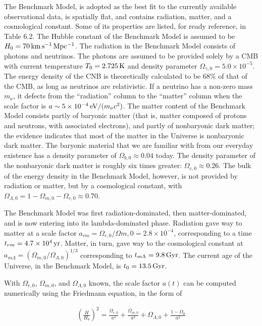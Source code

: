 \documentclass[a4paper,11pt]{article}
\begin{document}
The Benchmark Model, is adopted as the best fit to the currently available observational data, is spatially flat, and contains radiation, matter, and a cosmological constant. Some of its properties are listed, for ready reference, in Table 6.2. The Hubble constant of the Benchmark Model is assumed to be $H_0=70\,{\rm km\,s^{-1}\,Mpc^{-1}}$. The radiation in the Benchmark Model consists of photons and neutrinos. The photons are assumed to be provided solely by a CMB with current temperature $T_0=2.725\,{\rm K}$ and density parameter $\Omega_{\gamma,0}=5.0\times10^{-5}$. The energy density of the CNB is theoretically calculated to be 68\% of that of the CMB, as long as neutrinos are relativistic. If a neutrino has a non-zero mass $m_\nu$, it defects from the ``radiation'' column to the ``matter'' column when the scale factor is $a\sim5\times10^{-4}\,{\rm eV}/(m_\nu c^2)$. The matter content of the Benchmark Model consists partly of baryonic matter (that is, matter composed of protons and neutrons, with associated electrons), and partly of nonbaryonic dark matter; the evidence indicates that most of the matter in the Universe is nonbaryonic dark matter. The baryonic material that we are familiar with from our everyday existence has a density parameter of $\Omega_{b,0}\approx0.04$ today. The density parameter of the nonbaryonic dark matter is roughly six times greater: $\Omega_{c,0}\approx0.26$. The bulk of the energy density in the Benchmark Model, however, is not provided by radiation or matter, but by a cosmological constant, with $\Omega_{\Lambda,0}=1-\Omega_{m,0}-\Omega_{r,0}\approx0.70$.

{\noindent}The Benchmark Model was first radiation-dominated, then matter-dominated, and is now entering into its lambda-dominated phase. Radiation gave way to matter at a scale factor $a_{rm}=\Omega_{r,0}/\Omega{m,0}=2.8\times10^{-4}$, corresponding to a time $t_{rm}=4.7\times10^4\,{\rm yr}$. Matter, in turn, gave way to the cosmological constant at $a_{m\Lambda}=(\Omega_{m,0}/\Omega_{\Lambda,0})^{1/3}$ corresponding to $t_{m\Lambda}=9.8\,{\rm Gyr}$. The current age of the Universe, in the Benchmark Model, is $t_0=13.5\,{\rm Gyr}$.

{\noindent}With $\Omega_{r,0}$, $\Omega_{m,0}$, and $\Omega_{\Lambda,0}$ known, the scale factor $a(t)$ can be computed numerically using the Friedmann equation, in the form of

\begin{align*}
    \left(\frac{H}{H_0}\right)^2 = \frac{\Omega_{r,0}}{a^4} + \frac{\Omega_{m,0}}{a^3} + \Omega_{\Lambda,0} + \frac{1-\Omega_0}{a^2}
\end{align*}
\end{document}
